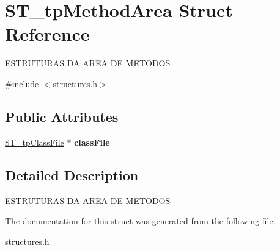 \hypertarget{structST__tpMethodArea}{}\section{S\+T\+\_\+tp\+Method\+Area Struct Reference}
\label{structST__tpMethodArea}




 E\+S\+T\+R\+U\+T\+U\+R\+AS DA A\+R\+EA DE M\+E\+T\+O\+D\+OS  




{\ttfamily \#include $<$structures.\+h$>$}

\subsection*{Public Attributes}
\begin{DoxyCompactItemize}
\item 
\mbox{\label{structST__tpMethodArea_a389dad4d3fa3d70696111d3f3ccd8cee}} 
\mbox{\hyperlink{structures_8h_a300c8e4693c608a0fc0d5f210b5448b5}{S\+T\+\_\+tp\+Class\+File}} $\ast$ {\bfseries class\+File}
\end{DoxyCompactItemize}


\subsection{Detailed Description}


 E\+S\+T\+R\+U\+T\+U\+R\+AS DA A\+R\+EA DE M\+E\+T\+O\+D\+OS 

The documentation for this struct was generated from the following file\+:\begin{DoxyCompactItemize}
\item 
\mbox{\hyperlink{structures_8h}{structures.\+h}}\end{DoxyCompactItemize}
